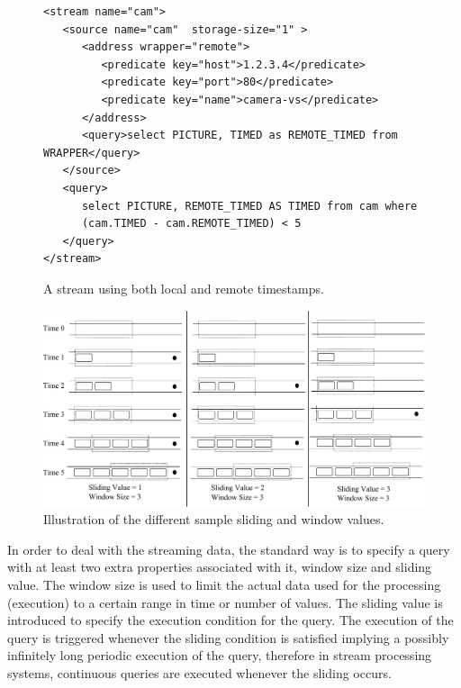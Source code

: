 \begin{figure}%
  \centering
  \lstset{numbers=left, numberstyle=\footnotesize}
\begin{lstlisting}
<stream name="cam">
   <source name="cam"  storage-size="1" >
      <address wrapper="remote">
         <predicate key="host">1.2.3.4</predicate>
         <predicate key="port">80</predicate>
         <predicate key="name">camera-vs</predicate>
      </address>
      <query>select PICTURE, TIMED as REMOTE_TIMED from WRAPPER</query>
   </source>
   <query>
      select PICTURE, REMOTE_TIMED AS TIMED from cam where 
      (cam.TIMED - cam.REMOTE_TIMED) < 5
   </query>
</stream>
\end{lstlisting}
   \caption{A stream using both local and remote timestamps.}
  \label{vs:complex-time}
\end{figure}

\begin{figure}
  \centering
  \includegraphics[width=1\columnwidth]{ch-gsn-figures/sliding-window-visually}
  \caption{Illustration of the different sample sliding and window values.}
  \label{fig:sliding-window-visually}
\end{figure}

In order to deal with the streaming data, the standard way is to specify
a query with at least two extra properties associated with it,
window size and sliding value. The window size is used to limit
the actual data used for the processing (execution)  to a certain range
in time or number of values. The sliding value is introduced to
specify the execution condition for the query. The execution of the
query is triggered whenever the sliding condition is satisfied implying a possibly infinitely long periodic
execution of the query, therefore in stream processing systems, continuous queries are executed whenever the sliding occurs.

